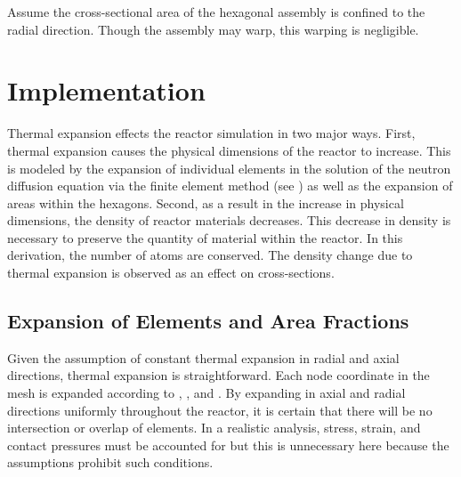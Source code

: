   Assume the cross-sectional area of the hexagonal assembly is confined to the
  radial direction. Though the assembly may warp, this warping is negligible.
  
  


\section{Implementation}
  Thermal expansion effects the reactor simulation in two major ways. First,
  thermal expansion causes the physical dimensions of the reactor to increase. 
  This is modeled by the expansion of individual elements in the solution of the
  neutron diffusion equation via the finite element method (see
  ) as well as the expansion of areas within the 
  hexagons.  Second, as a result in the increase in physical dimensions, the 
  density of reactor materials decreases. This decrease in density is necessary
  to preserve the quantity of material within the reactor. In this derivation,
  the number of atoms are conserved. The density change due to thermal expansion 
  is observed as an effect on cross-sections.

  \subsection{Expansion of Elements and Area Fractions}
    Given the assumption of constant thermal expansion in radial and axial
    directions, thermal expansion is straightforward. Each node coordinate in
    the mesh is expanded according to , ,
    and . By expanding in axial and radial directions
    uniformly throughout the reactor, it is certain that there will be no
    intersection or overlap of elements. In a realistic analysis, stress,
    strain, and contact pressures must be accounted for but this is unnecessary
    here because the assumptions prohibit such conditions.

